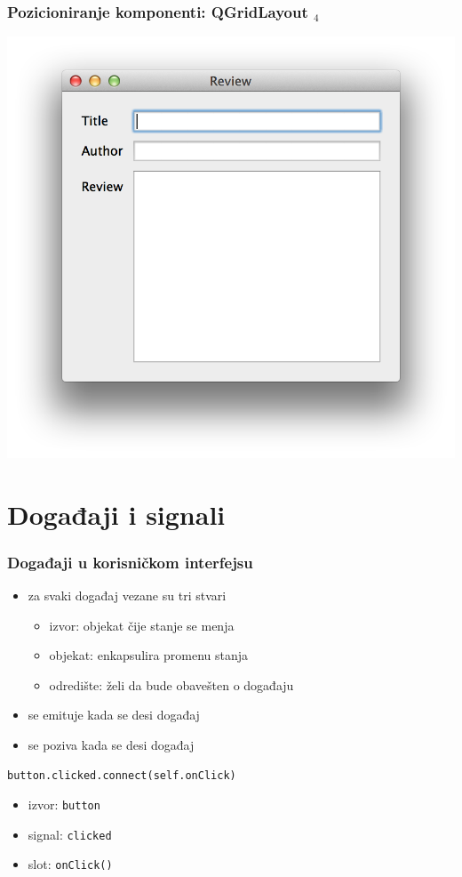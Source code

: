 \documentclass[utf8,compress]{beamer}
\begin{document}
\begin{frame}[fragile]
  \frametitle{Pozicioniranje komponenti: QGridLayout $_4$}
\begin{center}
\includegraphics[scale=0.5]{pyqt09.png}
\end{center}
\end{frame}

\section[Slots+Signals]{Događaji i signali}

\begin{frame}[fragile]
  \frametitle{Događaji u korisničkom interfejsu}
  \begin{itemize}
    \item za svaki događaj vezane su tri stvari
    \begin{itemize}
      \item izvor: objekat čije stanje se menja
      \item objekat: enkapsulira promenu stanja
      \item odredište: želi da bude obavešten o događaju
    \end{itemize}
    \item {} se emituje kada se desi događaj
    \item {} se poziva kada se desi događaj
  \end{itemize}
\begin{verbatim}
button.clicked.connect(self.onClick)
\end{verbatim}
  \begin{itemize}
    \item izvor: \texttt{button}
    \item signal: \texttt{clicked}
    \item slot: \texttt{onClick()}
  \end{itemize}
\end{frame}
\end{document}
